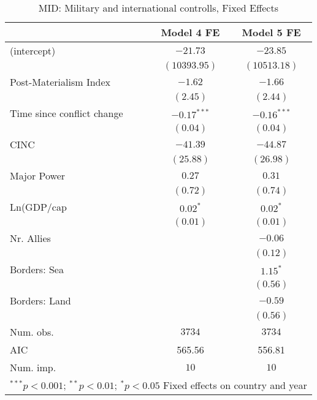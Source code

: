 
\begin{table}
\begin{center}
\begin{tabular}{l c c}
\toprule
 & Model 4 FE & Model 5 FE \\
\midrule
(intercept)                & $-21.73$      & $-23.85$      \\
                           & $(10393.95)$  & $(10513.18)$  \\
Post-Materialism Index     & $-1.62$       & $-1.66$       \\
                           & $(2.45)$      & $(2.44)$      \\
Time since conflict change & $-0.17^{***}$ & $-0.16^{***}$ \\
                           & $(0.04)$      & $(0.04)$      \\
CINC                       & $-41.39$      & $-44.87$      \\
                           & $(25.88)$     & $(26.98)$     \\
Major Power                & $0.27$        & $0.31$        \\
                           & $(0.72)$      & $(0.74)$      \\
Ln(GDP/cap                 & $0.02^{*}$    & $0.02^{*}$    \\
                           & $(0.01)$      & $(0.01)$      \\
Nr. Allies                 &               & $-0.06$       \\
                           &               & $(0.12)$      \\
Borders: Sea               &               & $1.15^{*}$    \\
                           &               & $(0.56)$      \\
Borders: Land              &               & $-0.59$       \\
                           &               & $(0.56)$      \\
\midrule
Num. obs.                  & $3734$        & $3734$        \\
AIC                        & 565.56        & 556.81        \\
Num. imp.                  & $10$          & $10$          \\
\bottomrule
\multicolumn{3}{l}{\scriptsize{$^{***}p<0.001$; $^{**}p<0.01$; $^{*}p<0.05$ 
 Fixed effects on country and year}}
\end{tabular}
\caption{MID: Military and international controlls, Fixed Effects}
\label{MID_2_FE_PM}
\end{center}
\end{table}
